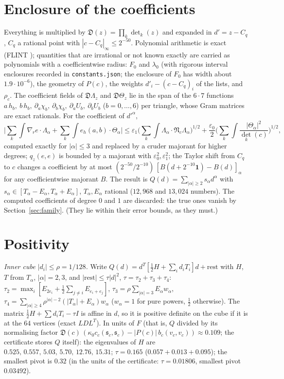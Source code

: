 \documentclass[11pt]{article}
\theoremstyle{remark}
\newcommand{\N}{\mathfrak{N}}
\newcommand{\s}{\mathfrak{s}}
\newcommand{\D}{\mathfrak{D}}
\newcommand{\gr}{\nabla_{\!r}}
\begin{document}
\section{Enclosure of the coefficients}
Everything is multiplied by $\D(z)=\prod_k\det_k(z)$ and expanded in $d'=z-C_q$, $C_q$ a rational point with
$|c-C_q|_\infty\le2^{-50}$. Polynomial arithmetic is exact (FLINT \cite{flint}); quantities that are irrational or not
known exactly are carried as polynomials with a coefficientwise radius: $F_0$ and $\lambda_0$ (with rigorous interval enclosures recorded in \texttt{constants.json}; the enclosure of $F_0$
has width about $1.9\cdot10^{-6}$), the
geometry of $P(c)$, the weights $d'_i-(c-C_q)_i$ of the lists, and $\rho_c$. The coefficient fields of $\D\Lambda_z$
and $\D\Theta_z$ lie in the span of the $6\cdot7$ functions $a\,h_b,\ b\,h_b,\ \partial_a\chi_b,\ \partial_b\chi_b,\
\partial_aU_b,\ \partial_bU_b$ ($b=0,\dots,6$) per triangle, whose Gram matrices are exact rationals. For the
coefficient of $d'^\alpha$,
\[
\Big|\sum_k\!\int\gr e\cdot\Lambda_\alpha+\sum_k\!\int e_h(a,b)\cdot\Theta_\alpha\Big|\le
\varepsilon_1\Big(\sum_k\!\int\Lambda_\alpha\cdot\N_c\Lambda_\alpha\Big)^{1/2}+
\frac{\varepsilon_0}2\Big(\sum_k\!\int\frac{|\Theta_\alpha|^2}{\det_k(c)}\Big)^{1/2},
\]
computed exactly for $|\alpha|\le3$ and replaced by a cruder majorant for higher degrees; $q_z(e,e)$ is bounded by a
majorant with $\varepsilon_0^2,\varepsilon_1^2$; the Taylor shift from $C_q$ to $c$ changes a coefficient by at most
$(2^{-50}/2^{-10})\,[B(d+2^{-10}\mathbf 1)-B(d)]_\alpha$ for any coefficientwise majorant $B$. The result is
$Q(d)=\sum_{|\alpha|\ge2}s_\alpha d^\alpha$ with $s_\alpha\in[T_\alpha-E_\alpha,T_\alpha+E_\alpha]$, $T_\alpha,E_\alpha$
rational ($12{,}968$ and $13{,}024$ numbers). The computed coefficients of degree $0$ and $1$ are discarded: the true ones
vanish by Section~\ref{sec:family}. (They lie within their error bounds, as they must.)

\section{Positivity}
\emph{Inner cube $|d_i|\le\rho=1/128$.} Write $Q(d)=d^T[\frac12H+\sum_id_iT_i]d+\text{rest}$ with $H$, $T$ from
$T_\alpha$, $|\alpha|=2,3$, and $|\text{rest}|\le\tau|d|^2$, $\tau=\tau_2+\tau_3+\tau_4$:
$\tau_2=\max_i[E_{2e_i}+\frac12\sum_{j\ne i}E_{e_i+e_j}]$, $\tau_3=\rho\sum_{|\alpha|=3}E_\alpha w_\alpha$,
$\tau_4=\sum_{|\alpha|\ge4}\rho^{|\alpha|-2}(|T_\alpha|+E_\alpha)w_\alpha$ ($w_\alpha=1$ for pure powers, $\frac12$
otherwise). The matrix $\frac12H+\sum d_iT_i-\tau I$ is affine in $d$, so it is positive definite on the cube if it is
at the $64$ vertices (exact $LDL^T$). In units of $F$ (that is, $Q$ divided by its normalising factor
$\D(c)\,(\kappa_0c_c(\s_c,\s_c)-|P(c)|\,b_c(v_c,v_c))\approx0.109$; the certificate stores $Q$ itself): the eigenvalues
of $H$ are $0.525,\,0.557,\,5.03,\,5.70,\,12.76,\,15.31$; $\tau=0.165$ ($0.057+0.013+0.095$); the smallest pivot is
$0.32$ (in the units of the certificate: $\tau=0.01806$, smallest pivot $0.03492$).
\end{document}
